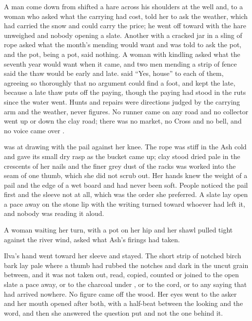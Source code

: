 A man come down from  shifted a hare across his shoulders at the well and, to a woman who asked what the carrying had cost, told her to ask the weather, which had carried the snow and could carry the price; he went off toward  with the hare unweighed and nobody opening a slate. Another with a cracked jar in a sling of rope asked what the month's mending would want and was told to ask the pot, and the pot, being a pot, said nothing. A woman with kindling asked what the seventh year would want when it came, and two men mending a strip of fence said the thaw would be early and late.  said “Yes, house” to each of them, agreeing so thoroughly that no argument could find a foot, and kept the late, because a late thaw puts off the paying, though the paying had stood in the ruts since the water went. Hunts and repairs were directions judged by the carrying arm and the weather, never figures. No runner came on any road and no collector went up or down the clay road; there was no market, no Cross and no bell, and no voice came over .

 was at  drawing with the pail against her knee. The rope was stiff in the Ash cold and gave its small dry rasp as the bucket came up; clay stood dried pale in the crescents of her nails and the finer grey dust of the racks was worked into the seam of one thumb, which she did not scrub out. Her hands knew the weight of a pail and the edge of a wet board and had never been soft. People noticed the pail first and the sleeve not at all, which was the order she preferred. A slate lay open a pace away on the stone lip with the writing turned toward whoever had left it, and nobody was reading it aloud.

A woman waiting her turn, with a pot on her hip and her shawl pulled tight against the river wind, asked what Ash's firings had taken.

Ilva's hand went toward her sleeve and stayed. The short strip of notched birch bark lay pale where a thumb had rubbed the notches and dark in the uncut grain between, and it was not taken out, read, copied, counted or joined to the open slate a pace away, or to the charcoal under , or to the cord, or to any saying that had arrived nowhere. No figure came off the wood. Her eyes went to the asker and her mouth opened after both, with a half-beat between the looking and the word, and then she answered the question put and not the one behind it.

